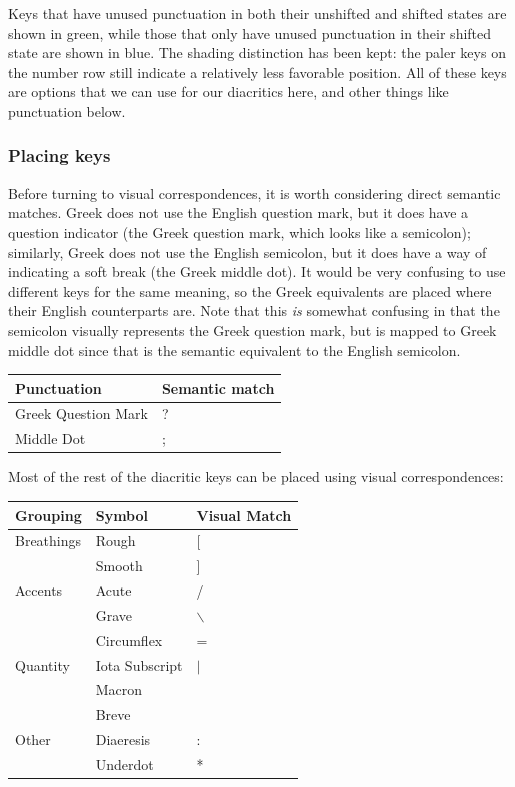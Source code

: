 \documentclass[11pt]{article}
\begin{document}
Keys that have unused punctuation in both their unshifted and shifted states are shown in green, while those that only have unused punctuation in their shifted state are shown in blue. The shading distinction has been kept: the paler keys on the number row still indicate a relatively less favorable position. All of these keys are options that we can use for our diacritics here, and other things like punctuation below.

\subsubsection{Placing keys}
\label{sec:org932d462}

Before turning to visual correspondences, it is worth considering direct semantic matches. Greek does not use the English question mark, but it does have a question indicator (the Greek question mark, which looks like a semicolon); similarly, Greek does not use the English semicolon, but it does have a way of indicating a soft break (the Greek middle dot). It would be very confusing to use different keys for the same meaning, so the Greek equivalents are placed where their English counterparts are. Note that this \emph{is} somewhat confusing in that the semicolon visually represents the Greek question mark, but is mapped to Greek middle dot since that is the semantic equivalent to the English semicolon.

\begin{center}
\begin{tabular}{ll}
Punctuation & Semantic match\\
\hline
Greek Question Mark & ?\\
Middle Dot & ;\\
\end{tabular}
\end{center}

Most of the rest of the diacritic keys can be placed using visual correspondences:

\begin{center}
\begin{tabular}{lll}
Grouping & Symbol & Visual Match\\
\hline
Breathings & Rough & [\\
 & Smooth & ]\\
Accents & Acute & /\\
 & Grave & $\backslash$\\
 & Circumflex & =\\
Quantity & Iota Subscript & \(\vert{}\)\\
 & Macron & \\
 & Breve & \\
Other & Diaeresis & :\\
 & Underdot & *\\
\end{tabular}
\end{center}
\end{document}
